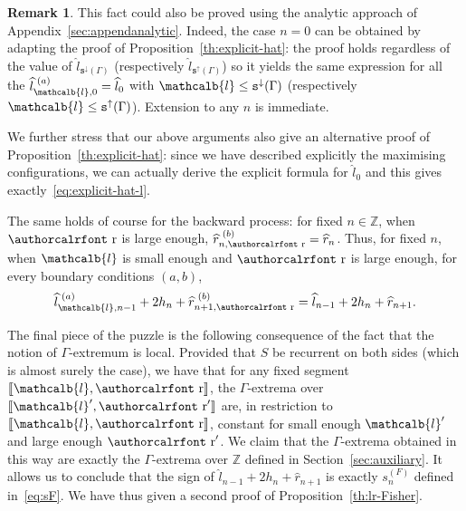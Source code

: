 \documentclass[10pt]{amsart}
\theoremstyle{definition}\newtheorem{defi}[theo]{Definition}\newtheorem{rema}[theo]{Remark}\newtheorem{exam}[theo]{Example}\newtheorem{exem}[theo]{Example}\newtheorem{nota}[theo]{Notation}
\newcommand{\mathcalc}[1]{\text{\authorcalrfont #1}}
\newcommand{\Z}{\mathbb{Z}}
\newcommand{\gG}{\Gamma}
\newcommand{\ts}{\mathtt{s}}
\newcommand{\tsdown}{\ts^\downarrow}
\newcommand{\tsup}{\ts^\uparrow}
\newcommand{\ls}{\widehat{l}}
\newcommand{\rs}{\widehat{r}}
\renewcommand{\ell}{\mathcalb{l}}
\newcommand{\err}{\mathcalc{r}}
\newcommand{\llbracket}{\mathopen{[\mkern -2.7mu[}}
\newcommand{\rrbracket}{\mathclose{]\mkern -2.7mu]}}
\newcommand{\lbra}{\llbracket}
\newcommand{\rbra}{\rrbracket}
\begin{document}
\begin{rema}
This fact could also be proved using the analytic approach of Appendix~\ref{sec:appendanalytic}. Indeed, the case $n=0$ can be obtained by adapting the proof of Proposition~\ref{th:explicit-hat}: the proof holds regardless of the value of $\ls_{\tsdown(\gG)}$ (respectively $\ls_{\tsup(\gG)}$) so it yields the same expression for all the $\ls_{\ell, 0}^{\,\,(a)}=\ls_0$ with $\ell \le \tsdown(\gG)$ (respectively $\ell \le \tsup(\gG)$). Extension to any $n$ is immediate.

We further stress that our above arguments also give an alternative proof of Proposition~\ref{th:explicit-hat}: since we have described explicitly the maximising configurations, we can actually derive the explicit formula for $\ls_0$ and this gives exactly~\eqref{eq:explicit-hat-l}.
\end{rema} The same holds of course for the backward process: for fixed $n\in\Z$, when $\err $ is large enough, $\rs^{\,\,(b)}_{n, \err}=\rs_n$. Thus, for fixed $n$, when $\ell$ is small enough and $\err$ is large enough, for every boundary conditions $(a, b)$,
\[
\ls_{\ell, n-1}^{\,\,(a)}+2 h_n + \rs_{n+1, \err}^{\,\,(b)}= \ls_{ n-1}+2 h_n + \rs_{n+1}.
\]


The final piece of the puzzle is the following consequence of the fact that the notion of $\gG$-extremum is local. Provided that $S$ be recurrent on both sides (which is almost surely the case), we have that for any fixed segment $\lbra\ell, \err\rbra$, the $\gG$-extrema over $\lbra\ell', \err'\rbra$ are, in restriction to $\lbra\ell, \err\rbra$, constant for small enough $\ell'$ and large enough $\err'$. We claim that the $\gG$-extrema obtained in this way are exactly the $\gG$-extrema over $\Z$ defined in Section~\ref{sec:auxiliary}. It allows us to conclude that the sign of $\ls_{ n-1}+2 h_n + \rs_{n+1}$ is exactly $s^{(F)}_n$ defined in~\eqref{eq:sF}. We have thus given a second proof of Proposition~\ref{th:lr-Fisher}.
\end{document}
